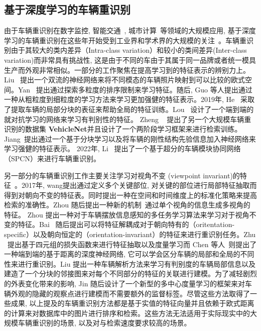 \subsection{基于深度学习的车辆重识别}
由于车辆重识别在数字监控, 智能交通~\cite{zhang2011data}, 城市计算~\cite{zheng2014urban}等领域的大规模应用, 基于深度学习的车辆重识别在这些年开始受到工业界和学术界的大规模的关注~\cite{liu2016large, liu2016deep, wang2017orientation, liu2017provid, bai2020disentangled, meng2020parsing}。车辆重识别由于其较大的类内差异（Intra-class variation）和较小的类间差异(Inter-class variation)而非常具有挑战性, 这是由于不同的车由于其属于同一品牌或者统一模具生产而外观非常相似。一部分的工作聚焦在提高学习到的特征表示的辨别力上。 Liu~\cite{liu2017beyond} 提出一个双流的神经网络来将不同模态的车辆照片映射到可以比较的欧式空间。Yan~\cite{yan2017exploiting} 提出通过探索多粒度的排序限制来学习特征。随后, Guo 等人提出通过一种从粗粒度到细粒度的学习方法来学习更加强健的特征表示。2019年, He~\cite{he2019part} 采取了提取车辆的局部分块的表征来帮助全局的特征训练。Lou ~\cite{lou2019embedding}设计了一个端到端的就对抗学习的网络来学习有判别性的特征。
Zheng ~\cite{zheng2020vehiclenet} 提出了另一个大规模车辆重识别的数据集 \textbf{VehicleNet}并且设计了一个两阶段学习框架来进行检索训练。Jiang~\cite{jiang2021robust}提出通过一个基于分块学习以及将车辆的刚性结构先验信息加入神经网络来学习强健的特征表示。 2022年, Li~\cite{li2022super} 提出了一个基于超分的车辆模块协同网络 （SPCN）来进行车辆重识别。 \par
另一部分的车辆重识别工作主要关注学习对视角不变 (viewpoint invariant)的特征~\cite{wang2017orientation, zhou2018aware, tang2019pamtri, bai2020disentangled}。2017年, wang提出通过定义多个关键部位, 对关键的部位进行局部特征抽取而得到对朝向不变的特征表。同时提出一种在空间和时间维度上的标准化策略来提高检索的准确性。Zhou 随后提出一种新的机制~\cite{zhou2018aware}通过单个视角的信息生成多视角的特征。 Zhou 提出一种对于车辆摆放信息感知的多任务学习算法来学习对于视角不变的特征。Bai ~\cite{bai2020disentangled}随后提出可以将特征解耦成对于朝向特有的（oritentation-specific）以及朝向恒定的（orientation-invariant）的特征来进行重识别任务。Zhu ~\cite{zhu2019vehicle}提出基于四元组的损失函数来进行特征抽取以及度量学习而 Chen 等人~\cite{chen2020vehicle}则提出了一种端到端的基于距离的深度神经网络, 它可以学会区分车辆的局部和全局的不同性来进行重识别。Liu 提出一种车辆解析方法来学习有判别度的车辆局部信息以及建造了一个分块的邻接图来对每个不同部分的特征的关联进行建模。为了减轻剧烈的外表变化带来的影响, Jin 随后设计了一个新型的多中心度量学习的框架来对车辆外观的隐藏的观察点进行建模而不需要额外的监督标签。尽管这些方法取得了一些成果, 以上提及的车辆重识别方法都是基于实值的特征向量并且依赖于欧式距离的计算来对数据库中的图片进行排序和检索。这些方法无法适用于实际现实中的大规模车辆重识别的场景, 以及对与检索速度要求较高的场景。
